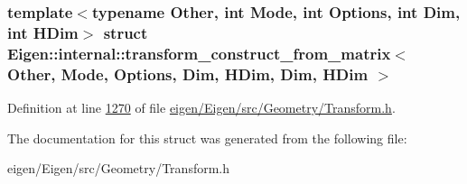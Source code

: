 \subsubsection*{template$<$typename Other, int Mode, int Options, int Dim, int H\+Dim$>$\newline
struct Eigen\+::internal\+::transform\+\_\+construct\+\_\+from\+\_\+matrix$<$ Other, Mode, Options, Dim, H\+Dim, Dim, H\+Dim $>$}



Definition at line \hyperlink{eigen_2_eigen_2src_2_geometry_2_transform_8h_source_l01270}{1270} of file \hyperlink{eigen_2_eigen_2src_2_geometry_2_transform_8h_source}{eigen/\+Eigen/src/\+Geometry/\+Transform.\+h}.



The documentation for this struct was generated from the following file\+:\begin{DoxyCompactItemize}
\item 
eigen/\+Eigen/src/\+Geometry/\+Transform.\+h\end{DoxyCompactItemize}
